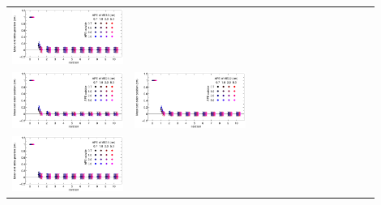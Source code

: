 \documentclass[compress]{beamer}
\begin{document}
\begin{frame}
\begin{tabular}{p{0.3\linewidth} p{0.3\linewidth} p{0.3\linewidth}}
\includegraphics[width=\linewidth]{me13_meanstdev.png} & \\
\includegraphics[width=\linewidth]{me21_meanstdev.png} &
\includegraphics[width=\linewidth]{me22_meanstdev.png} & \\
\includegraphics[width=\linewidth]{me31_meanstdev.png} &

\end{tabular}
\end{frame}
\end{document}

